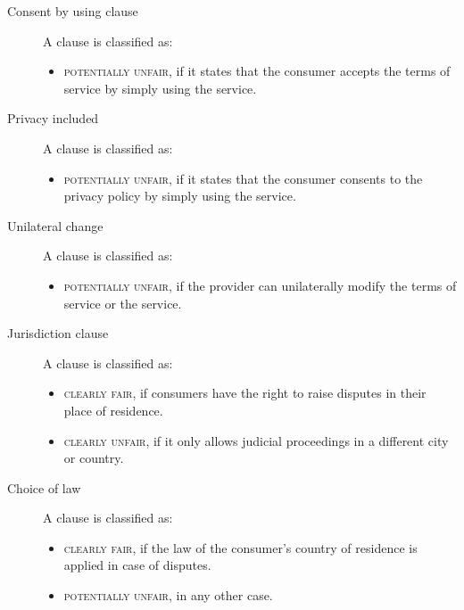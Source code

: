 \begin{description}
    \item[Consent by using clause] 
        A clause is classified as:
        \begin{itemize}
            \item \textsc{potentially unfair}, if it states that the consumer accepts the terms of service by simply using the service.
        \end{itemize}
         
    \item[Privacy included] 
        A clause is classified as:
        \begin{itemize}
            \item \textsc{potentially unfair}, if it states that the consumer consents to the privacy policy by simply using the service.
        \end{itemize}

    \item[Unilateral change] 
        A clause is classified as:
        \begin{itemize}
            \item \textsc{potentially unfair}, if the provider can unilaterally modify the terms of service or the service.
        \end{itemize}

    \item[Jurisdiction clause] 
        A clause is classified as:
        \begin{itemize}
            \item \textsc{clearly fair}, if consumers have the right to raise disputes in their place of residence.
            \item \textsc{clearly unfair}, if it only allows judicial proceedings in a different city or country.
        \end{itemize}

    \item[Choice of law] 
        A clause is classified as:
        \begin{itemize}
            \item \textsc{clearly fair}, if the law of the consumer's country of residence is applied in case of disputes. 
            \item \textsc{potentially unfair}, in any other case.
        \end{itemize}


\end{description}
